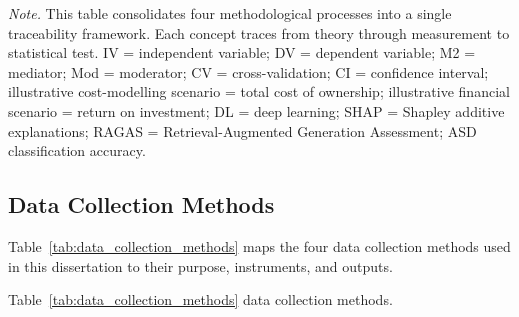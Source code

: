 \vspace{0.5em}
\noindent\textit{Note.} This table consolidates four methodological processes into a single traceability framework. Each concept traces from theory through measurement to statistical test. IV = independent variable; DV = dependent variable; M2 = mediator; Mod = moderator; CV = cross-validation; CI = confidence interval; illustrative cost-modelling scenario = total cost of ownership; illustrative financial scenario = return on investment; DL = deep learning; SHAP = Shapley additive explanations; RAGAS = Retrieval-Augmented Generation Assessment; ASD classification accuracy.
\fi %

\fi %

\label{sec:data_operationalisation}
\label{tab:data_analysis_chain}
\label{tab:data_collection_methods}
\label{tab:analytical_purpose}
\label{tab:operationalisation}
\label{tab:concept_to_analysis}

\iffalse %
\subsection{Data Collection Methods}

Table~\ref{tab:data_collection_methods} maps the four data collection methods used in this dissertation to their purpose, instruments, and outputs.


\iffalse %
\noindent Table~\ref{tab:data_collection_methods} data collection methods.

